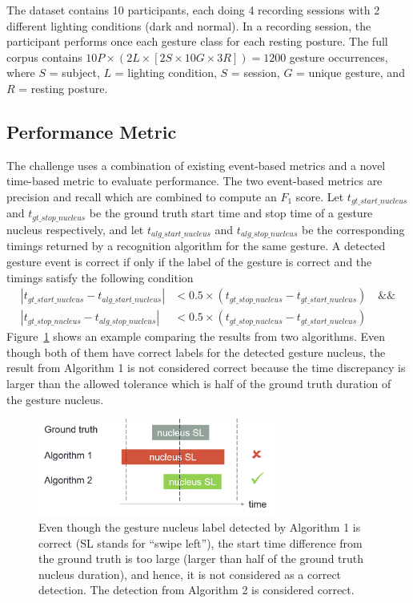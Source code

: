 The dataset contains 10 participants, each doing 4 recording sessions with 2
different lighting conditions (dark and normal). In a recording session, the
participant performs once each gesture class for each resting posture. The full
corpus contains $10P\times (2L \times [2S \times 10G \times 3R]) = 1200$
gesture occurrences, where $S$ = subject, $L$ = lighting condition, $S$ =
session, $G$ = unique gesture, and $R$ = resting posture.

\subsection{Performance Metric}
The challenge uses a combination of existing event-based metrics and a novel
time-based metric to evaluate performance. The two event-based metrics are
precision and recall which are combined to compute an $F_1$ score. Let
$t_{gt\_start\_nucleus}$ and $t_{gt\_stop\_nucleus}$ be the ground truth start time and stop time of a gesture nucleus respectively,
and let $t_{alg\_start\_nucleus}$ and $t_{alg\_stop\_nucleus}$ be the
corresponding timings returned by a recognition algorithm for the same gesture.
A detected gesture event is correct if only if the label of the gesture is
correct and the timings satisfy the following condition
\begin{align*}
|t_{gt\_start\_nucleus} - t_{alg\_start\_nucleus}| &< 0.5\times
(t_{gt\_stop\_nucleus} - t_{gt\_start\_nucleus}) \quad \text{\&\&} \\
|t_{gt\_stop\_nucleus} - t_{alg\_stop\_nucleus}| &< 0.5\times
(t_{gt\_stop\_nucleus} - t_{gt\_start\_nucleus})
\end{align*}
Figure~\ref{fig:true-positive} shows an example comparing the results from two
algorithms. Even though both of them have correct labels for the detected
gesture nucleus, the result from Algorithm 1 is not considered correct because
the time discrepancy is larger than the allowed tolerance which is half of the
ground truth duration of the gesture nucleus.

\begin{figure}[tbh]
\centering
\includegraphics[width=0.7\textwidth]{figures/true_positive.png}
\caption{Even though the gesture nucleus label detected by Algorithm 1 is
correct (SL stands for ``swipe left''), the start time difference from the
ground truth is too large (larger than half of the ground truth nucleus
duration), and hence, it is not considered as a correct detection. The detection
from Algorithm 2 is considered correct.}
\label{fig:true-positive}
\end{figure}

